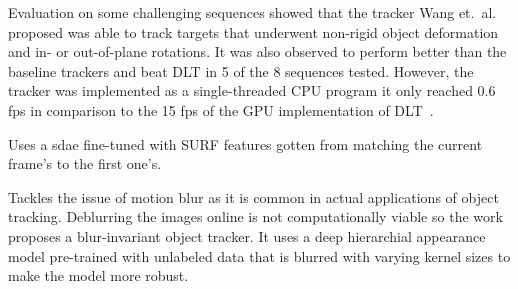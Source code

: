 Evaluation on some challenging sequences showed that the tracker Wang et.~al.~\cite{LEARNED_HIERARCH}
proposed was able to track targets that underwent non-rigid object deformation and in- or
out-of-plane rotations. It was also observed to perform better than the baseline
trackers and beat DLT in 5 of the 8 sequences tested. However, the tracker was implemented
as a single-threaded CPU program it only reached 0.6 fps in comparison to the 15 fps of
the GPU implementation of DLT~\cite{LEARNING_DEEP}.

\cite{SMS_DLT}
Uses a \ac{sdae} fine-tuned with SURF features gotten from matching the current frame's
to the first one's.

\cite{BLUR_TRACK}
Tackles the issue of motion blur as it is common in actual applications of object
tracking. Deblurring the images online is not computationally viable so the work
proposes a blur-invariant object tracker. It uses a deep hierarchial appearance
model pre-trained with unlabeled data that is blurred with varying kernel sizes
to make the model more robust. 